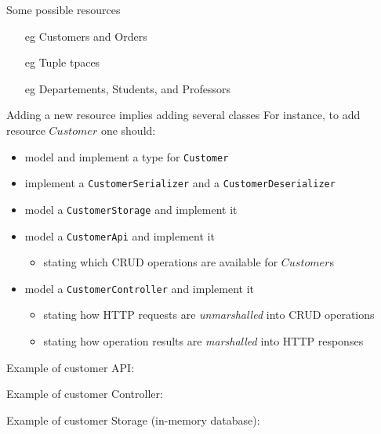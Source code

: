 \documentclass[presentation]{beamer}\mode<presentation>{\usetheme{AMSBolognaFC}}
\begin{document}
\begin{frame}[allowframebreaks]
    \framebreak

    \begin{exampleblock}{Some possible resources}
        \begin{itemize}
            \item[eg] Customers and Orders
            \item[eg] Tuple tpaces
            \item[eg] Departements, Students, and Professors
        \end{itemize}
    \end{exampleblock}

    \begin{alertblock}{Adding a new resource implies adding several classes}
        For instance, to add resource $Customer$ one should:
        \begin{itemize}
            \item model and implement a type for \texttt{Customer}
            \item implement a \texttt{CustomerSerializer} and a \texttt{CustomerDeserializer}
            \item model a \texttt{CustomerStorage} and implement it
            \item model a \texttt{CustomerApi} and implement it
            \begin{itemize}
                \item stating which CRUD operations are available for $Customer$s
            \end{itemize}
            \item model a \texttt{CustomerController} and implement it
            \begin{itemize}
                \item stating how HTTP requests are \emph{unmarshalled} into CRUD operations
                \item stating how operation results are \emph{marshalled} into HTTP responses
            \end{itemize}
        \end{itemize}
    \end{alertblock}

    \framebreak

    Example of customer API:
    

    \framebreak

    Example of customer Controller:
    

    \framebreak

    Example of customer Storage (in-memory database):
    

\end{frame}
\end{document}
